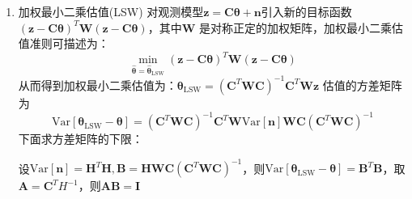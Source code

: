 \documentclass{article}
\def\E{\mathbb{E}}
\def\Var{\textrm{Var}}
\begin{document}
\begin{enumerate}
假定观测模型为：
\begin{equation}
\bm{z} = \bm{C} \bm{\theta} + \bm{n}
\end{equation}
其中$\bm{n}$ 是观测噪声，$\bm{\theta}$是$M$维向量，$\bm{z}$ 是$N$维向量，$N>M$。最小二乘估值准则为：
\begin{equation}
\min_{\hat{\bm{\theta}}=\hat{\bm{\theta}}_{\mathrm{LS}} } (\bm{z} - \bm{C} \bm{\theta})^T(\bm{z} - \bm{C} \bm{\theta})
\end{equation}
解得
\begin{subequations}
\begin{align}
\hat{\bm{\theta}}_{\mathrm{LS}} & = (\bm{C}^T\bm{C})^{-1} \bm{C}^T \bm{z} \\
& = \bm{\theta} + (\bm{C}^T\bm{C})^{-1} \bm{C}^T \bm{n}
\end{align}
因为$\E[\bm{n}]=\bm{0}$，所以最小二乘估值对给定的观测模型是无偏估计。
\end{subequations}
最小二乘估值的方差矩阵为
$$
\Var[\bm{\theta}_{\textrm{LS}}-\bm{\theta}] = (\bm{C}^T\bm{C})^{-1} \bm{C}^T \Var[\bm{n}] \bm{C}(\bm{C}^T\bm{C})^{-1} 
$$
\item 加权最小二乘估值(LSW)
对观测模型$\bm{z} = \bm{C} \bm{\theta} + \bm{n}$引入新的目标函数$ (\bm{z} - \bm{C} \bm{\theta})^T\bm{W}(\bm{z} - \bm{C} \bm{\theta})$，其中$\bm{W}$
是对称正定的加权矩阵，加权最小二乘估值准则可描述为：
$$
\min_{\hat{\bm{\theta}}=\hat{\bm{\theta}}_{\mathrm{LSW}} } (\bm{z} - \bm{C} \bm{\theta})^T\bm{W}(\bm{z} - \bm{C} \bm{\theta})
$$
从而得到加权最小二乘估值为：$\bm{\theta}_{\mathrm{LSW}} =  (\bm{C}^T\bm{W}\bm{C})^{-1} \bm{C}^T \bm{W}\bm{z}$
估值的方差矩阵为
$$
\Var[\bm{\theta}_{\textrm{LSW}}-\bm{\theta}] = (\bm{C}^T\bm{W}\bm{C})^{-1} \bm{C}^T\bm{W} \Var[\bm{n}] \bm{W}\bm{C}(\bm{C}^T\bm{W}\bm{C})^{-1} 
$$
下面求方差矩阵的下限：

设$\Var[\bm{n}]=\bm{H}^T\bm{H},\bm{B}=\bm{H}\bm{W}\bm{C}(\bm{C}^T\bm{W}\bm{C})^{-1} $，则$\Var[\bm{\theta}_{\textrm{LSW}}-\bm{\theta}]=\bm{B}^T\bm{B}$，取$\bm{A}=\bm{C}^TH^{-1}$，则$\bm{A}\bm{B}=\bm{I}$


\end{enumerate}
\end{document}
